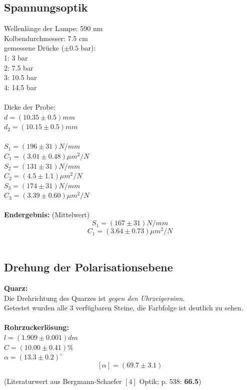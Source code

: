 \documentclass[12pt,a4paper]{article}
\begin{document}
\begin{multicols}{2}
\subsection{Spannungsoptik}

Wellenlänge der Lampe: 590 nm\\
Kolbendurchmesser: 7.5 cm\\
gemessene Drücke ($\pm 0.5$ bar):\\
1: 3 bar\\
2: 7.5 bar\\
3: 10.5 bar\\
4: 14.5 bar\\
\\
Dicke der Probe:\\
$d=(10.35 \pm 0.5)mm$\\
$d_2=(10.15 \pm 0.5)mm$\\
\\
$S_1=(196\pm 31)N/mm$\\
\indent $C_1= (3.01 \pm 0.48) \mu m ^2/N$\\
$S_2=(131\pm 31)N/mm$\\
\indent $C_2= (4.5 \pm 1.1) \mu m ^2/N$\\
$S_3=(174\pm 31)N/mm$\\
\indent $C_3= (3.39 \pm 0.60) \mu m ^2/N$\\
\\
\textbf{Endergebnis:} (Mittelwert)
$$S_1=(167\pm 31)N/mm$$
$$C_1= (3.64 \pm 0.73) \mu m ^2/N$$\\



\subsection{Drehung der Polarisationsebene}

\textbf{Quarz:}\\
Die Drehrichtung des Quarzes ist \emph{gegen den Uhrzeigersinn.} \\
Getestet wurden alle 3 verfügbaren Steine, die Farbfolge ist deutlich zu sehen.\\
\\
\textbf{Rohrzuckerlösung:}\\
$l=(1.909\pm 0.001)dm$\\
$C = (10.00 \pm 0.41)\%$\\
$\alpha = (13.3 \pm 0.2)^\circ$
$$[\alpha] = (69.7 \pm 3.1)$$

(Literaturwert aus Bergmann-Schaefer $[4]$ Optik; p. 538: \textbf{66.5})


\end{multicols}
\end{document}
